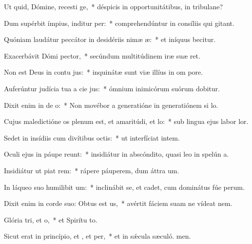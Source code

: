 \item Ut quid, Dómine, recesti ge,~* déspicis in opportunitátibus, in tribulane?
\item Dum supérbit ímpius, inditur per:~* comprehendúntur in consíliis qui gitant.
\item Quóniam laudátur peccátor in desidériis nimæ æ:~* et iníquus becitur.
\item Exacerbávit Dómi pector,~* secúndum multitúdinem iræ suæ  ret.
\item Non est Deus in contu jus:~* inquinátæ sunt viæ illíus in om pore.
\item Auferúntur judícia tua a cie jus:~* ómnium inimicórum suórum dobitur.
\item Dixit enim in de o:~* Non movébor a generatióne in generatiónem si lo.
\item Cujus maledictióne os plenum est, et amaritúdi, et lo:~* sub lingua ejus labor  lor.
\item Sedet in insídiis cum divítibus  octis:~* ut interfíciat intem.
\item Oculi ejus in páupe reunt:~* insidiátur in abscóndito, quasi leo in spelún a.
\item Insidiátur ut piat rem:~* rápere páuperem, dum áttra um.
\item In láqueo suo humilibit um:~* inclinábit se, et cadet, cum dominátus fúe perum.
\item Dixit enim in corde suo: Obtus est us,~* avértit fáciem suam ne vídeat  nem.
\item Glória tri, et o,~* et Spirítu to.
\item Sicut erat in princípio, et , et per,~* et in sǽcula sæculó. men.
